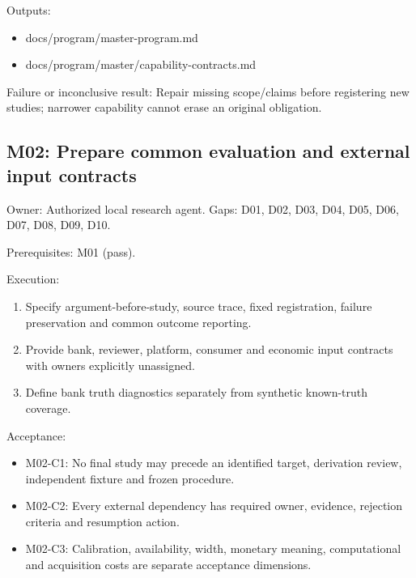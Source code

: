 \documentclass[
  11pt,
  a4paper,
]{article}
\providecommand{\tightlist}{%
  \setlength{\itemsep}{0pt}\setlength{\parskip}{0pt}}
\begin{document}
Outputs:

\begin{itemize}
\tightlist
\item
  docs/program/master-program.md
\item
  docs/program/master/capability-contracts.md
\end{itemize}

Failure or inconclusive result: Repair missing scope/claims before
registering new studies; narrower capability cannot erase an original
obligation.

\hypertarget{m02-prepare-common-evaluation-and-external-input-contracts}{%
\subsection{M02: Prepare common evaluation and external input
contracts}\label{m02-prepare-common-evaluation-and-external-input-contracts}}

Owner: Authorized local research agent. Gaps: D01, D02, D03, D04, D05,
D06, D07, D08, D09, D10.

Prerequisites: M01 (pass).

Execution:

\begin{enumerate}
\def\labelenumi{\arabic{enumi}.}
\tightlist
\item
  Specify argument-before-study, source trace, fixed registration,
  failure preservation and common outcome reporting.
\item
  Provide bank, reviewer, platform, consumer and economic input
  contracts with owners explicitly unassigned.
\item
  Define bank truth diagnostics separately from synthetic known-truth
  coverage.
\end{enumerate}

Acceptance:

\begin{itemize}
\tightlist
\item
  M02-C1: No final study may precede an identified target, derivation
  review, independent fixture and frozen procedure.
\item
  M02-C2: Every external dependency has required owner, evidence,
  rejection criteria and resumption action.
\item
  M02-C3: Calibration, availability, width, monetary meaning,
  computational and acquisition costs are separate acceptance
  dimensions.
\end{itemize}
\end{document}
